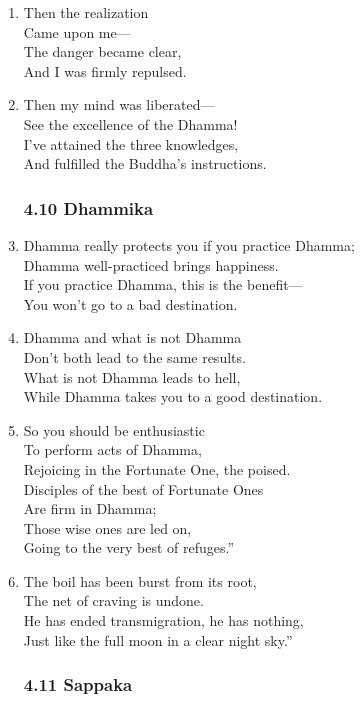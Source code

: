 \documentclass[10pt, openany]{book}
\newcommand*{\vleftofline}[1]{\leavevmode\llap{#1}}
\begin{document}
\begin{enumerate}
\item Then the realization\\
Came upon me—\\
The danger became clear,\\
And I was firmly repulsed.

\item Then my mind was liberated—\\
See the excellence of the Dhamma!\\
I’ve attained the three knowledges,\\
And fulfilled the Buddha’s instructions.

\subsubsection*{4.10 Dhammika}

\item \vleftofline{“}Dhamma really protects you if you practice Dhamma;\\
Dhamma well-practiced brings happiness.\\
If you practice Dhamma, this is the benefit—\\
You won’t go to a bad destination.

\item Dhamma and what is not Dhamma\\
Don’t both lead to the same results.\\
What is not Dhamma leads to hell,\\
While Dhamma takes you to a good destination.

\item So you should be enthusiastic \\
To perform acts of Dhamma,\\
Rejoicing in the Fortunate One, the poised.\\
Disciples of the best of Fortunate Ones \\
Are firm in Dhamma;\\
Those wise ones are led on, \\
Going to the very best of refuges.”

\item \vleftofline{“}The boil has been burst from its root,\\
The net of craving is undone.\\
He has ended transmigration, he has nothing,\\
Just like the full moon in a clear night sky.”

\subsubsection*{4.11 Sappaka}


\end{enumerate}
\end{document}
